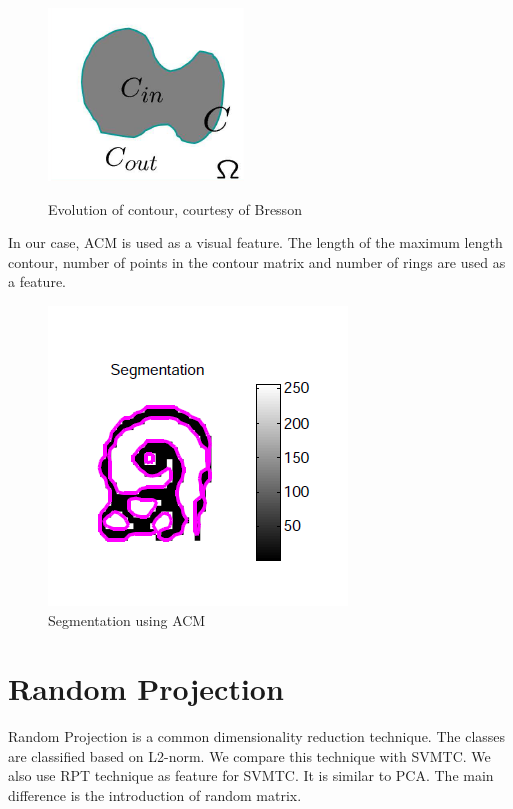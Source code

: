 \begin{figure}\centering
\includegraphics[scale=0.3]{./img/contour}\\
  \caption{Evolution of contour, courtesy of Bresson}\label{ACTE}
\end{figure}
In our case, ACM is used as a visual feature. The length of the maximum
length contour, number of points in the contour matrix and  number of rings are used as a feature.
\begin{figure}\centering
\includegraphics[scale=0.5]{./img/acm_crop}
  \caption{Segmentation using ACM}\label{LSM}
\end{figure}



\section{Random Projection}
Random Projection is a common dimensionality reduction technique\cite{shi}. The classes are classified based on L2-norm. We compare this technique with SVMTC. We also use RPT technique as feature for SVMTC. It is similar to PCA. The main difference is the introduction of random matrix.
